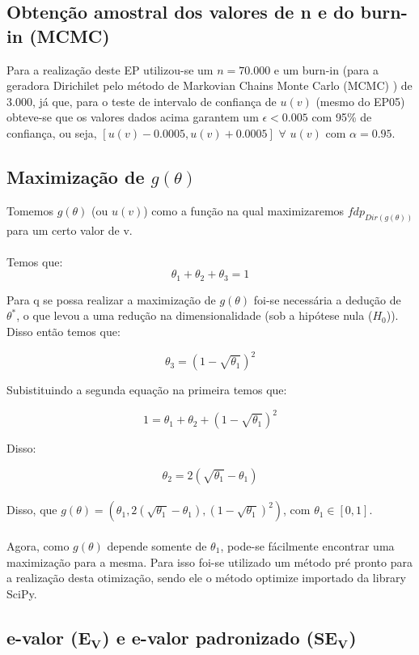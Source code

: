 \documentclass{article}
\begin{document}
\subsection{Obtenção amostral dos valores de n e do burn-in (MCMC)}

    Para a realização deste EP utilizou-se um $n = 70.000$ e um burn-in (para a geradora Dirichilet pelo método de Markovian Chains Monte Carlo (MCMC) ) de $3.000$, já que, para o teste de intervalo de confiança de $u(v)$ (mesmo do EP05) obteve-se que os valores dados acima garantem um $\epsilon < 0.005$ com 95\% de confiança, ou seja, $[u(v) - 0.0005, u(v) + 0.0005]$ $\forall$ $ u(v) $ com $ \alpha=0.95$.

\subsection{Maximização de $g(\theta)$}

    Tomemos $g(\theta)$ (ou $u(v)$) como a função na qual maximizaremos $fdp_{Dir(g(\theta))}$ para um certo valor de v.\\
    \\
    Temos que:
    $$ \theta_1+\theta_2+\theta_3 = 1$$
    
    Para q se possa realizar a maximização de $g(\theta)$ foi-se necessária a dedução de $\theta^*$, o que levou a uma redução na dimensionalidade (sob  a hipótese nula ($H_{0}$)). Disso então temos que:
    
    $$ \theta_3 = (1 - \sqrt{\theta_1})^2 $$
    
    Subistituindo a segunda equação na primeira temos que:
    
    $$ 1 = \theta_1+\theta_2+(1 - \sqrt{\theta_1})^2 $$
    
    Disso:
    
    $$ \theta_2 = 2(\sqrt{\theta_1}-\theta_1) $$
    \\
    Disso, que $ g(\theta) = (\theta_1,2(\sqrt{\theta_1}-\theta_1),(1-\sqrt{\theta_1})^2)$, com $\theta_1\in [0,1]$.\\
    \\
    Agora, como $g(\theta)$ depende somente de $\theta_{1}$, pode-se fácilmente encontrar uma maximização para a mesma. Para isso foi-se utilizado um método pré pronto para a realização desta otimização, sendo ele o método optimize importado da library SciPy.

\subsection{e-valor ($\bm{E_V}$) e e-valor padronizado ($\bm{SE_V}$)}
\end{document}
